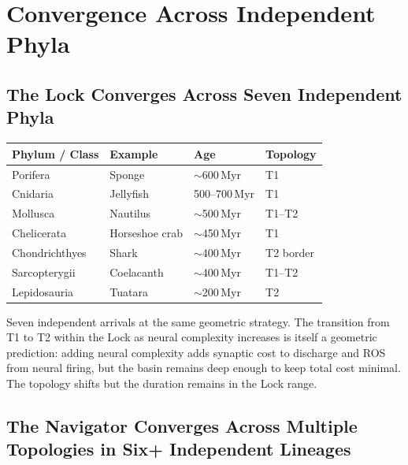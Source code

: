 \documentclass[10pt, a4paper]{article}
\begin{document}
\section{Convergence Across Independent
Phyla}
\label{sec:convergence}

\subsection{The Lock Converges Across
Seven Independent Phyla}

\begin{center}
\small
\begin{tabular}{p{3.5cm}p{3.0cm}p{2.0cm}p{3.0cm}}
\toprule
\textbf{Phylum / Class} &
\textbf{Example} &
\textbf{Age} &
\textbf{Topology}\\
\midrule
Porifera & Sponge & $\sim$600\,Myr & T1\\
Cnidaria & Jellyfish & 500--700\,Myr & T1\\
Mollusca & Nautilus & $\sim$500\,Myr & T1--T2\\
Chelicerata & Horseshoe crab & $\sim$450\,Myr & T1\\
Chondrichthyes & Shark & $\sim$400\,Myr & T2 border\\
Sarcopterygii & Coelacanth & $\sim$400\,Myr & T1--T2\\
Lepidosauria & Tuatara & $\sim$200\,Myr & T2\\
\bottomrule
\end{tabular}
\end{center}

Seven independent arrivals at the same
geometric strategy. The transition from
T1 to T2 within the Lock as neural
complexity increases is itself a geometric
prediction: adding neural complexity adds
synaptic cost to discharge and ROS from
neural firing, but the basin remains deep
enough to keep total cost minimal. The
topology shifts but the duration remains
in the Lock range.

\subsection{The Navigator Converges Across
Multiple Topologies in Six+ Independent
Lineages}
\end{document}
